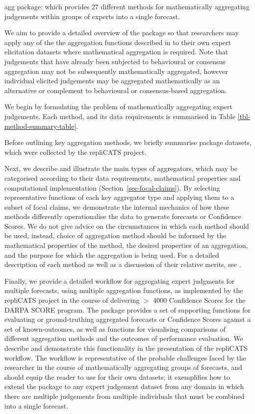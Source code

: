 \documentclass[article]{jss}
\begin{document}
agg package: which provides 27 different methods for mathematically
aggregating judgements within groups of experts into a single forecast.

We aim to provide a detailed overview of the  package so
that researchers may apply any of the the aggregation functions
described in \citep{Hanea2021} to their own expert elicitation datasets
where mathematical aggregation is required. Note that judgements that
have already been subjected to behavioural or consensus aggregation may
not be subsequently mathematically aggregated, however individual
elicited judgements may be aggregated mathematically as an alternative
or complement to behavioural or consensus-based aggregation.

We begin by formulating the problem of mathematically aggregating expert
judgements. Each method, and its data requirements is summarised in
Table \ref{tbl-method-summary-table}.

Before outlining key aggregation methods, we briefly summarise package
datasets, which were collected by the repliCATS project.

Next, we describe and illustrate the main types of aggregators, which
may be categorised according to their data requirements, mathematical
properties and computational implementation
(Section~\ref{sec-focal-claims}). By selecting representative functions
of each key aggregator type and applying them to a subset of focal
claims, we demonstrate the internal mechanics of how these methods
differently operationalise the data to generate forecasts or Confidence
Scores. We do not give advice on the circumstances in which each method
should be used, instead, choice of aggregation method should be informed
by the mathematical properties of the method, the desired properties of
an aggregation, and the purpose for which the aggregation is being used.
For a detailed description of each method as well as a discussion of
their relative merits, see \citep{Hanea2021}.

Finally, we provide a detailed workflow for aggregating expert judgments
for multiple forecasts, using multiple aggregation functions, as
implemented by the repliCATS project in the course of delivering \(>\)
4000 Confidence Scores for the DARPA SCORE program. The 
package provides a set of supporting functions for evaluating or
ground-truthing aggregated forecasts or Confidence Scores against a set
of known-outcomes, as well as functions for visualising comparisons of
different aggregation methods and the outcomes of performance
evaluation. We describe and demonstrate this functionality in the
presentation of the repliCATS workflow. The workflow is representative
of the probable challenges faced by the researcher in the course of
mathematically aggregating groups of forecasts, and should equip the
reader to use  for their own datasets; it exemplifies how
to extend the  package to any expert judgement dataset
from any domain in which there are multiple judgements from multiple
individuals that must be combined into a single forecast.
\end{document}
